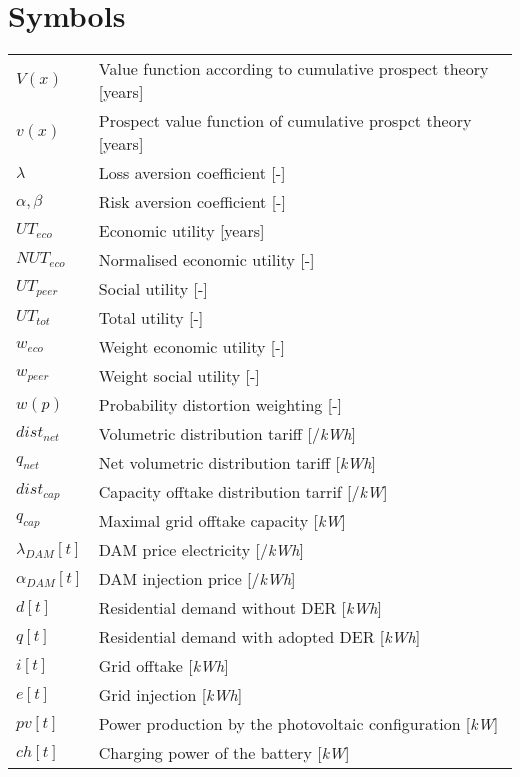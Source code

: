 \documentclass[master=ene,english]{kulemt}
\begin{document}
\section*{Symbols}
\begin{flushleft}
  \renewcommand{\arraystretch}{1.1}
  \begin{tabularx}{\textwidth}{@{}p{12mm}X@{}}
    $V(x)$    & Value function according to cumulative prospect theory [years]\\
    $v(x)$    & Prospect value function of cumulative prospct theory [years]\\
    $\lambda$ & Loss aversion coefficient [-]\\
    $\alpha,\beta$ & Risk aversion coefficient [-]\\
    $UT_{eco}$   & Economic utility [years] \\
    $NUT_{eco}$   & Normalised economic utility [-]\\
    $UT_{peer}$ & Social utility [-]\\
    $UT_{tot}$ & Total utility [-]\\
    $w_{eco}$ & Weight economic utility [-]\\
    $w_{peer}$ & Weight social utility [-]\\
    $w(p)$   & Probability distortion weighting [-]\\
    $dist_{net}$ &  Volumetric distribution tariff [\EUR{}/\textit{kWh}]\\
    $q_{net}$ & Net volumetric distribution tariff [\textit{kWh}] \\
    $dist_{cap}$ & Capacity offtake distribution tarrif [\EUR{}/\textit{kW}]\\
    $q_{cap}$ & Maximal grid offtake capacity [\textit{kW}]\\
    $\lambda_{DAM}[t]$ & DAM price electricity [\EUR{}/\textit{kWh}]\\
    $\alpha_{DAM}[t]$ & DAM injection price [\EUR{}/\textit{kWh}]\\
    $d[t]$ & Residential demand without DER [\textit{kWh}]\\
    $q[t]$ & Residential demand with adopted DER [\textit{kWh}]\\
    $i[t]$ & Grid offtake [\textit{kWh}]\\
    $e[t]$ & Grid injection [\textit{kWh}]\\
    $pv[t]$ & Power production by the photovoltaic configuration [\textit{kW}]\\
    $ch[t]$ & Charging power of the battery [\textit{kW}]\\

\end{tabularx}
\end{flushleft}
\end{document}
